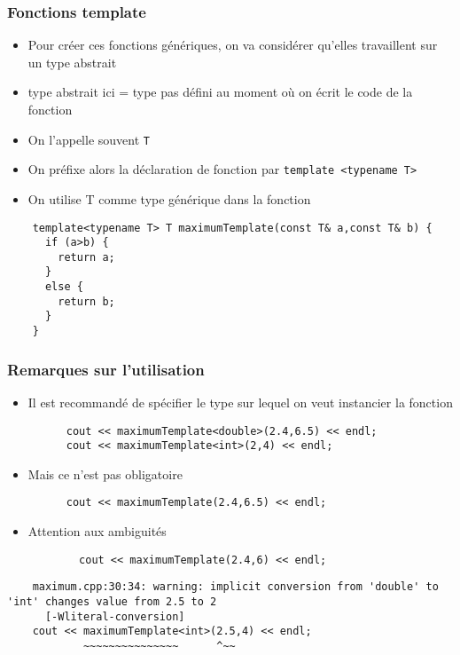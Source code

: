 
\begin{frame}[fragile]\frametitle{Fonctions template}
  \begin{itemize}
    \item Pour créer ces fonctions génériques, on va considérer qu'elles travaillent sur un type abstrait
    \item type abstrait ici = type pas défini au moment où on écrit le code de la fonction
    \item On l'appelle souvent \texttt{T}
    \item On préfixe alors la déclaration de fonction par \texttt{template <typename T>}
    \item On utilise T comme type générique dans la fonction
  \end{itemize}
  \begin{lstlisting}
    template<typename T> T maximumTemplate(const T& a,const T& b) {
      if (a>b) {
        return a;
      }
      else {
        return b;
      }
    }

  \end{lstlisting}
\end{frame}


\begin{frame}[fragile]\frametitle{Remarques sur l'utilisation}
  \begin{itemize}
    \item Il est recommandé de spécifier le type sur lequel on veut instancier la fonction
    \begin{lstlisting}
      cout << maximumTemplate<double>(2.4,6.5) << endl;
      cout << maximumTemplate<int>(2,4) << endl;
    \end{lstlisting}
    \item Mais ce n'est pas obligatoire
    \begin{lstlisting}
      cout << maximumTemplate(2.4,6.5) << endl;
    \end{lstlisting}
      \item Attention aux ambiguités
      \begin{lstlisting}
        cout << maximumTemplate(2.4,6) << endl;
      \end{lstlisting}
  \end{itemize}
  {\tiny \begin{verbatim}
    maximum.cpp:30:34: warning: implicit conversion from 'double' to 'int' changes value from 2.5 to 2
      [-Wliteral-conversion]
    cout << maximumTemplate<int>(2.5,4) << endl;
            ~~~~~~~~~~~~~~~      ^~~
  \end{verbatim}}
\end{frame}

